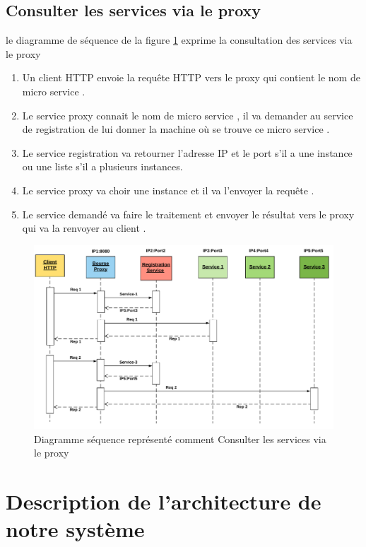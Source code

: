       \subsection{Consulter les services via le proxy }
    le diagramme de séquence de la figure \ref{fig:secance}   exprime  la  consultation des services via le proxy 
    \begin{enumerate}
    	
    	\item Un client HTTP envoie la requête HTTP vers le proxy qui contient le nom de micro service  .
    	
    	\item  Le service proxy connait le nom de micro service , il va demander au service  de registration de lui donner la machine où se trouve ce micro service .
    	
    	\item Le service registration  va retourner l'adresse IP et le port s'il a une instance ou une liste s'il a  plusieurs instances.
    	
    	\item  Le service proxy va choir une instance et il va l'envoyer la requête  .
    	
    	\item  Le service demandé va faire le traitement et envoyer le résultat vers le proxy qui va la renvoyer au client .
    \end{enumerate}
    
    
    \begin{figure}[H]
    	\centering
    	\includegraphics[width=0.7\linewidth]{images/secance}
    	\caption{Diagramme séquence représenté comment  Consulter les services via le proxy}
    	\label{fig:secance}
    \end{figure}
    
    
    
    
    
    \section{Description de l'architecture de notre système}
    
